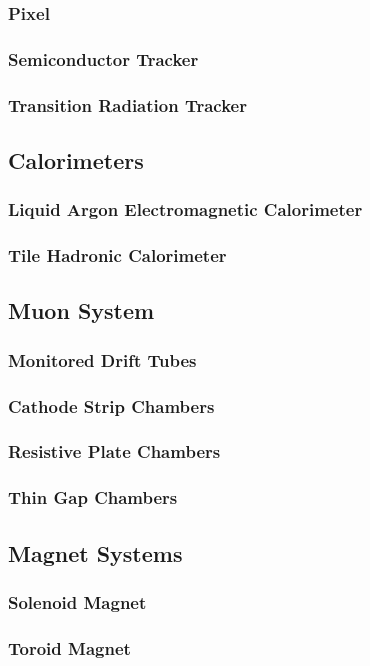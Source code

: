 		\subsubsection{Pixel}

		\subsubsection{Semiconductor Tracker}

		\subsubsection{Transition Radiation Tracker}

	\subsection{Calorimeters}

		\subsubsection{Liquid Argon Electromagnetic Calorimeter}

		\subsubsection{Tile Hadronic Calorimeter}

	\subsection{Muon System}

		\subsubsection{Monitored Drift Tubes}

		\subsubsection{Cathode Strip Chambers}

		\subsubsection{Resistive Plate Chambers} 

		\subsubsection{Thin Gap Chambers}

	\subsection{Magnet Systems}

		\subsubsection{Solenoid Magnet}

		\subsubsection{Toroid Magnet}

		